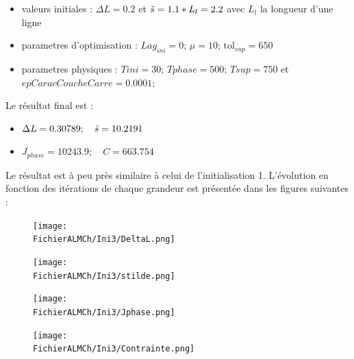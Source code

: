 \documentclass[11pt,a4paper]{article}
\begin{document}
\begin{itemize}
	\item valeurs initiales : $\Delta L=0.2$ et $\tilde{s}=1.1*L_l=2.2$ avec $L_l$ la longueur d'une ligne
	\item parametres d'optimisation : $Lag_{ini}=0$; $\mu=10$; $\textrm{tol}_{sup}=650$
	\item parametres physiques : $Tini=30;\,Tphase=500;\,Tsup=750$ et $epCaracCoucheCarre=0.0001;$
\end{itemize}

Le résultat final est :
\begin{itemize}
	\item $\Delta L= 0.30789 ;\quad \tilde{s}=10.2191$
	\item $J_{phase}=10243.9;\quad C= 663.754$
\end{itemize}

Le résultat est à peu près similaire à celui de l'initialisation 1.
L'évolution en fonction des itérations de chaque grandeur est présentée dans les figures suivantes :

\begin{figure}[H]
	\begin{minipage}{0.45\textwidth}
		\centering
		\texttt{[image: \\FichierALMCh/Ini3/DeltaL.png]}
	\end{minipage}
	\begin{minipage}{0.45\textwidth}
		\centering
		\texttt{[image: \\FichierALMCh/Ini3/stilde.png]}
	\end{minipage}	
\end{figure}

\begin{figure}[H]
	\begin{minipage}{0.45\textwidth}
		\centering
		\texttt{[image: \\FichierALMCh/Ini3/Jphase.png]}
	\end{minipage}
	\begin{minipage}{0.45\textwidth}
		\centering
		\texttt{[image: \\FichierALMCh/Ini3/Contrainte.png]}
	\end{minipage}	
\end{figure}

\setcounter{x}{0}
\end{document}
